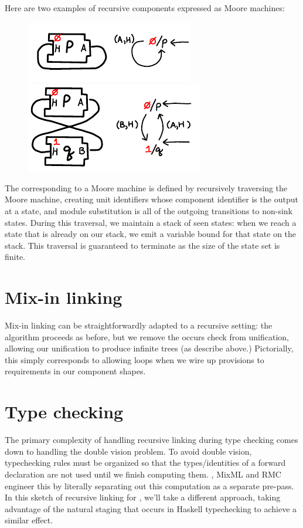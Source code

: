 Here are two examples of recursive components expressed as Moore
machines:

\begin{figure}[H]
\center\includegraphics{figures/moore-p.pdf}
\hspace{3em}
\includegraphics{figures/moore-pq.pdf}
\end{figure}

\noindent
The \uid{} corresponding to a Moore machine is defined by
recursively traversing the Moore machine, creating unit identifiers
whose component identifier is the output at a state, and module
substitution is all of the outgoing transitions to non-sink states. During
this traversal, we maintain a stack of seen states:  when we reach a
state that is already on our stack, we emit a variable bound
for that state on the stack.  This traversal
is guaranteed to terminate as the size of the state set is finite.

\section{Mix-in linking}

Mix-in linking can be straightforwardly adapted to a recursive
setting: the algorithm proceeds as before, but we remove the
occurs check from unification, allowing our unification to
produce infinite trees (as describe above.)  Pictorially,
this simply corresponds to allowing loops when we wire up provisions
to requirements in our component shapes.

\section{Type checking}

The primary complexity of handling recursive linking during type
checking comes down to handling the double vision problem.  To avoid
double vision, typechecking rules must be organized so that the
types/identities of a forward declaration are not used until we finish
computing them.  \OldBackpack{}, MixML and RMC engineer this by
literally separating out this computation as a separate pre-pass.  In
this sketch of recursive linking for \Backpack{}, we'll take a different
approach, taking advantage of the natural staging that occurs in Haskell
typechecking to achieve a similar effect.

